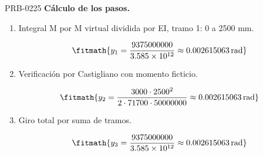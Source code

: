 \begin{studiumworked}{PRB-0225}
\textbf{Cálculo de los pasos.}

\begin{enumerate}

\item Integral M por M virtual dividida por EI, tramo 1: 0 a 2500 mm.

\[\fitmath{y_{1}=\frac{9375000000}{3.585\times10^{12}}\approx 0.002615063\,\mathrm{rad}}\]

\item Verificación por Castigliano con momento ficticio.

\[\fitmath{y_{2}=\frac{3000\cdot {2500}^{2}}{2\cdot 71700\cdot 50000000}\approx 0.002615063\,\mathrm{rad}}\]

\item Giro total por suma de tramos.

\[\fitmath{y_{3}=\frac{9375000000}{3.585\times10^{12}}\approx 0.002615063\,\mathrm{rad}}\]

\end{enumerate}


\end{studiumworked}

